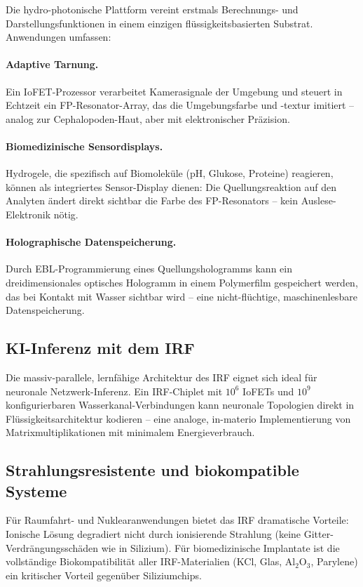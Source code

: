﻿\documentclass[a4paper,12pt]{scrreprt}
\theoremstyle{definition}
\begin{document}
Die hydro-photonische Plattform vereint erstmals Berechnungs- und
Darstellungsfunktionen in einem einzigen flüssigkeitsbasierten Substrat.
Anwendungen umfassen:

\paragraph{Adaptive Tarnung.}
Ein IoFET-Prozessor verarbeitet Kamerasignale der Umgebung und steuert
in Echtzeit ein FP-Resonator-Array, das die Umgebungsfarbe und -textur
imitiert -- analog zur Cephalopoden-Haut, aber mit elektronischer Präzision.

\paragraph{Biomedizinische Sensordisplays.}
Hydrogele, die spezifisch auf Biomoleküle (pH, Glukose, Proteine) reagieren,
können als integriertes Sensor-Display dienen: Die Quellungsreaktion auf
den Analyten ändert direkt sichtbar die Farbe des FP-Resonators --
kein Auslese-Elektronik nötig.

\paragraph{Holographische Datenspeicherung.}
Durch EBL-Programmierung eines Quellungshologramms kann ein dreidimensionales
optisches Hologramm in einem Polymerfilm gespeichert werden, das bei
Kontakt mit Wasser sichtbar wird -- eine nicht-flüchtige, maschinenlesbare
Datenspeicherung.

\subsection{KI-Inferenz mit dem IRF}

Die massiv-parallele, lernfähige Architektur des IRF eignet sich ideal für
neuronale Netzwerk-Inferenz. Ein IRF-Chiplet mit $10^6$ IoFETs und
$10^9$ konfigurierbaren Wasserkanal-Verbindungen kann neuronale Topologien
direkt in Flüssigkeitsarchitektur kodieren -- eine analoge, in-materio
Implementierung von Matrixmultiplikationen mit minimalem Energieverbrauch.

\subsection{Strahlungsresistente und biokompatible Systeme}

Für Raumfahrt- und Nuklearanwendungen bietet das IRF dramatische Vorteile:
Ionische Lösung degradiert nicht durch ionisierende Strahlung (keine
Gitter-Verdrängungsschäden wie in Silizium). Für biomedizinische Implantate
ist die vollständige Biokompatibilität aller IRF-Materialien (KCl, Glas,
Al$_2$O$_3$, Parylene) ein kritischer Vorteil gegenüber Siliziumchips.
\end{document}
